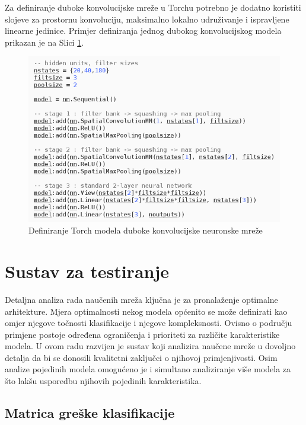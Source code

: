 \documentclass[lmodern, utf8, diplomski, numeric]{fer}
\begin{document}
Za definiranje duboke konvolucijske mreže u Torchu potrebno je dodatno koristiti slojeve za prostornu konvoluciju, maksimalno lokalno udruživanje i ispravljene linearne jedinice. Primjer definiranja jednog dubokog konvolucijskog modela prikazan je na Slici \ref{fig:cnnmodel}.

\begin{figure}[ht!]
\centering
\includegraphics[width=16cm]{slike/cnn_model.png}
\caption{Definiranje Torch modela duboke konvolucijske neuronske mreže}
\label{fig:cnnmodel}
\end{figure}

\newpage

\section{Sustav za testiranje}

Detaljna analiza rada naučenih mreža ključna je za pronalaženje optimalne arhitekture. Mjera optimalnosti nekog modela općenito se može definirati kao omjer njegove točnosti klasifikacije i njegove kompleksnosti. Ovisno o području primjene postoje određena ograničenja i prioriteti za različite karakteristike modela. U ovom radu razvijen je sustav koji analizira naučene mreže u dovoljno detalja da bi se donosili kvalitetni zaključci o njihovoj primjenjivosti. Osim analize pojedinih modela omogućeno je i simultano analiziranje više modela za što lakšu usporedbu njihovih pojedinih karakteristika.  

\subsection{Matrica greške klasifikacije}
\end{document}
